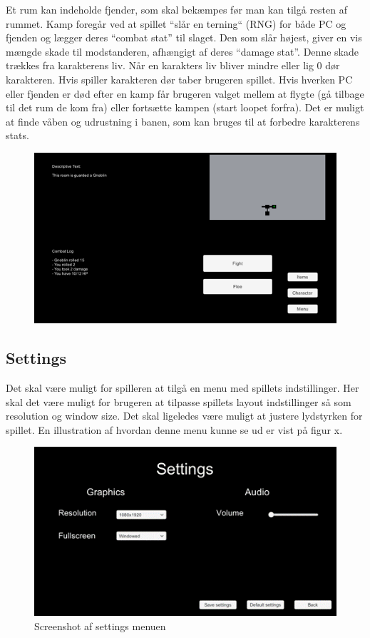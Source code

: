 Et rum kan indeholde fjender, som skal bekæmpes før man kan tilgå resten af rummet. Kamp foregår ved at spillet “slår en terning“ (RNG) for både PC og fjenden og lægger deres “combat stat” til slaget. Den som slår højest, giver en vis mængde skade til modstanderen, afhængigt af deres “damage stat”. Denne skade trækkes fra karakterens liv. Når en karakters liv bliver mindre eller lig 0 dør karakteren. Hvis spiller karakteren dør taber brugeren spillet.  Hvis hverken PC eller fjenden er død efter en kamp får brugeren valget mellem at flygte (gå tilbage til det rum de kom fra) eller fortsætte kampen (start loopet forfra). 
Det er muligt at finde våben og udrustning i banen, som kan bruges til at forbedre karakterens stats. 

\begin{figure}[h]
\centering
\includegraphics[width = \textwidth]{02-Body/Images/CombatScreen-udkast.png}
\caption{}
\label{fig:Combat-udkast}
\end{figure}

\subsection{Settings}
Det skal være muligt for spilleren at tilgå en menu med spillets indstillinger. Her skal det være muligt for brugeren at tilpasse spillets layout indstillinger så som resolution og window size. Det skal ligeledes være muligt at justere lydstyrken for spillet. En illustration af hvordan denne menu kunne se ud er vist på figur x.

\begin{figure}[h]
\centering
\includegraphics[width = \textwidth]{02-Body/Images/SettingsMenu-udkast.png}
\caption{Screenshot af settings menuen}
\label{fig:Settings-udkast}
\end{figure}